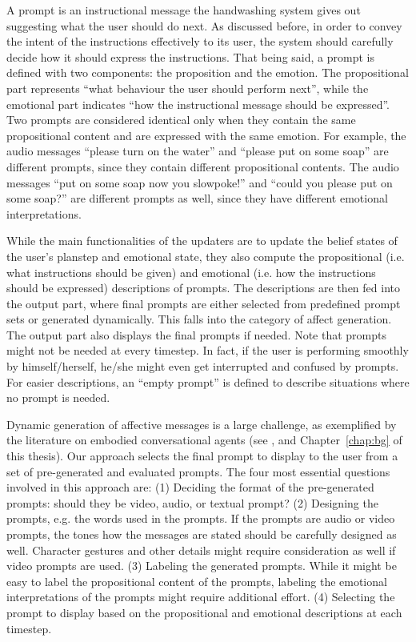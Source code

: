 A prompt is an instructional message the handwashing system gives out suggesting what the user should do next. As discussed before, in order to convey the intent of the instructions effectively to its user, the system should carefully decide how it should express the instructions. That being said, a prompt is defined with two components: the proposition and the emotion. The propositional part represents ``what behaviour the user should perform next'', while the emotional part indicates ``how the instructional message should be expressed''. Two prompts are considered identical only when they contain the same propositional content and are expressed with the same emotion. For example, the audio messages ``please turn on the water'' and ``please put on some soap'' are different prompts, since they contain different propositional contents. The audio messages ``put on some soap now you slowpoke!'' and ``could you please put on some soap?'' are different prompts as well, since they have different emotional interpretations.

While the main functionalities of the updaters are to update the belief states of the user's planstep and emotional state, they also compute the propositional (i.e. what instructions should be given) and emotional (i.e. how the instructions should be expressed) descriptions of prompts. The descriptions are then fed into the output part, where final prompts are either selected from predefined prompt sets or generated dynamically. This falls into the category of affect generation. The output part also displays the final prompts if needed. Note that prompts might not be needed at every timestep. In fact, if the user is performing smoothly by himself/herself, he/she might even get interrupted and confused by prompts. For easier descriptions, an ``empty prompt'' is defined to describe situations where no prompt is needed.

Dynamic generation of affective messages is a large challenge, as exemplified by the literature on embodied conversational agents (see \cite{cassell2000embodied, niewiadomski2013computational}, and Chapter~\ref{chap:bg} of this thesis). Our approach selects the final prompt to display to the user from a set of pre-generated and evaluated prompts. The four most essential questions involved in this approach are: (1) Deciding the format of the pre-generated prompts: should they be video, audio, or textual prompt? (2) Designing the prompts, e.g. the words used in the prompts. If the prompts are audio or video prompts, the tones how the messages are stated should be carefully designed as well. Character gestures and other details might require consideration as well if video prompts are used. (3) Labeling the generated prompts. While it might be easy to label the propositional content of the prompts, labeling the emotional interpretations of the prompts might require additional effort. (4) Selecting the prompt to display based on the propositional and emotional descriptions at each timestep. 

